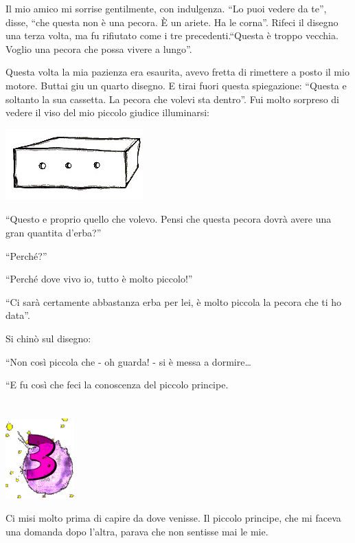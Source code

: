 \documentclass[11pt]{scrbook}
\begin{document}
Il mio amico mi sorrise gentilmente, con indulgenza. ``Lo puoi vedere da te'', disse, ``che questa non è una pecora. È un ariete. Ha le corna''. Rifeci il disegno una terza volta, ma fu rifiutato come i tre precedenti.``Questa è troppo vecchia. Voglio una pecora che possa vivere a lungo''.

Questa volta la mia pazienza era esaurita, avevo fretta di rimettere a posto il mio motore. Buttai giu un quarto disegno. E tirai fuori questa spiegazione: ``Questa e soltanto la sua cassetta. La pecora che volevi sta dentro''. Fui molto sorpreso di vedere il viso del mio piccolo giudice illuminarsi:

\begin{center}
\includegraphics{img/2e}
\end{center}

``Questo e proprio quello che volevo. Pensi che questa pecora dovrà avere una gran quantita d'erba?''

``Perché?''

``Perché dove vivo io, tutto è molto piccolo!''

``Ci sarà certamente abbastanza erba per lei, è molto piccola la pecora che ti ho data''.

Si chinò sul disegno:

``Non così piccola che - oh guarda! - si è messa a dormire\ldots{}

``E fu così che feci la conoscenza del piccolo principe.

\chapter{}
\begin{center}
\includegraphics{img/chapter3}
\end{center}

Ci misi molto prima di capire da dove venisse. Il piccolo principe, che mi faceva una domanda dopo l'altra, parava che non sentisse mai le mie.
\end{document}
